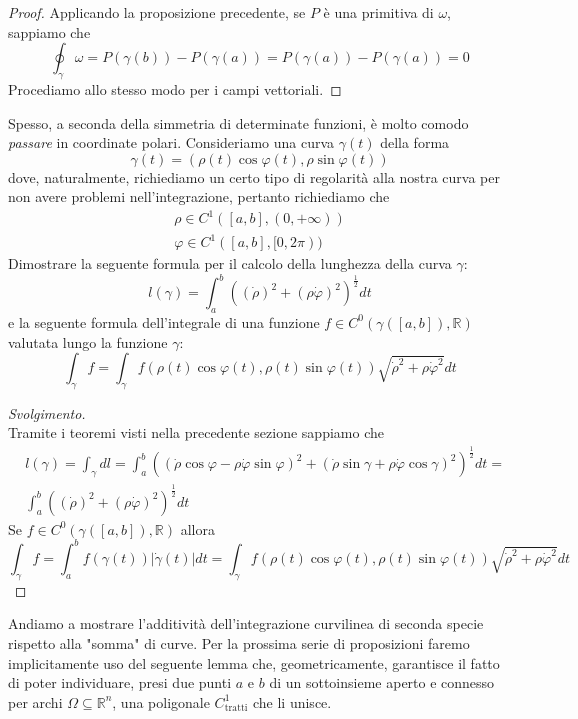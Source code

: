 \begin{proof}
Applicando la proposizione precedente, se $P$ è una primitiva di $\omega$, sappiamo che
$$
\oint_\gamma \omega = P(\gamma(b)) - P(\gamma(a)) = P(\gamma(a)) - P(\gamma(a)) = 0 
$$
Procediamo allo stesso modo per i campi vettoriali.
\end{proof}
\begin{exercise}
Spesso, a seconda della simmetria di determinate funzioni, è molto comodo \emph{passare} in coordinate polari. Consideriamo una curva $\gamma(t)$ della forma
$$
\gamma(t) = (\rho (t) \cos{\varphi(t)}, \rho \sin{\varphi(t)})
$$ 
dove, naturalmente, richiediamo un certo tipo di regolarità alla nostra curva per non avere problemi nell'integrazione, pertanto richiediamo che
\begin{align*}
	\rho \in C^1([a, b], (0, +\infty)) \\
	\varphi \in C^1([a, b], [0, 2\pi))
\end{align*}
Dimostrare la seguente formula per il calcolo della lunghezza della curva $\gamma$:
$$
l(\gamma) = \int_a^b ((\dot{\rho})^2 + (\rho \dot{\varphi})^2)^{\frac{1}{2}} dt
$$
e la seguente formula dell'integrale di una funzione $f \in C^0(\gamma([a, b]), \mathbb{R})$ valutata lungo la funzione $\gamma$:
$$
\int_\gamma f = \int_\gamma f(\rho(t) \cos{\varphi(t)}, \rho(t) \sin{\varphi(t)}) \sqrt{\dot{\rho}^2 + \rho \dot{\varphi}^2} dt
$$
\end{exercise}
\begin{proof}[Svolgimento] \hspace{1cm} \\
Tramite i teoremi visti nella precedente sezione sappiamo che
\begin{align*}
&l(\gamma) = \int_\gamma dl = \int_a^b ( (\dot{\rho} \cos{\varphi} - \rho \dot{\varphi} \sin{\varphi})^ 2 + (\dot{\rho} \sin{\gamma} + \rho \dot{\varphi} \cos{\gamma})^2)^{\frac{1}{2}} dt = \\
&\int_a^b ((\dot{\rho})^2 + (\rho \dot{\varphi})^2)^{\frac{1}{2}}dt
\end{align*}
Se $f \in C^0(\gamma([a, b]), \mathbb{R})$ allora
$$
\int_\gamma f = \int_a^b f(\gamma(t))|\dot{\gamma}(t)|dt = \int_\gamma f(\rho(t) \cos{\varphi(t)}, \rho(t) \sin{\varphi(t)}) \sqrt{\dot{\rho}^2 + \rho \dot{\varphi}^2} dt
$$
\end{proof}
Andiamo a mostrare l'additività dell'integrazione curvilinea di seconda specie rispetto alla "somma" di curve.
Per la prossima serie di proposizioni faremo implicitamente uso del seguente lemma che, geometricamente, garantisce il fatto di poter individuare, presi due punti $a$ e $b$ di un sottoinsieme aperto e connesso per archi $\Omega \subseteq \mathbb{R}^n$, una poligonale $C^1_\text{tratti}$ che li unisce.
